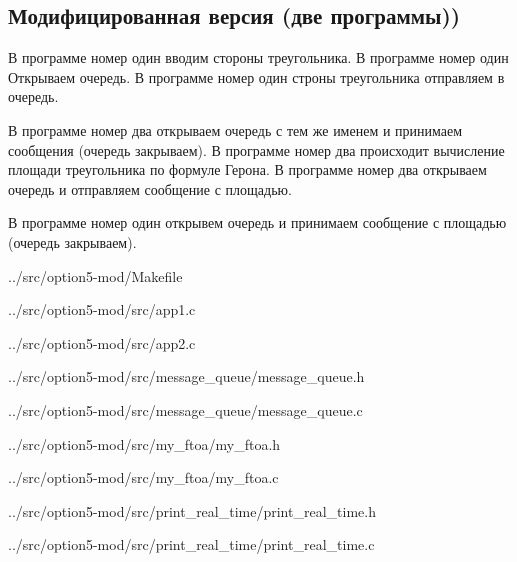 \subsection*{Модифицированная версия (две программы))}

В программе номер один вводим стороны треугольника. В программе номер один Открываем очередь. В программе номер один строны треугольника отправляем в очередь.

В программе номер два открываем очередь с тем же именем и принимаем сообщения (очередь закрываем). В программе номер два происходит вычисление площади треугольника по формуле Герона. В программе номер два открываем очередь и отправляем сообщение с площадью.

В программе номер один открывем очередь и принимаем сообщение с площадью (очередь закрываем).

\newpage


{../src/option5-mod/Makefile}


{../src/option5-mod/src/app1.c}


{../src/option5-mod/src/app2.c}


{../src/option5-mod/src/message_queue/message_queue.h}


{../src/option5-mod/src/message_queue/message_queue.c}


{../src/option5-mod/src/my_ftoa/my_ftoa.h}


{../src/option5-mod/src/my_ftoa/my_ftoa.c}


{../src/option5-mod/src/print_real_time/print_real_time.h}


{../src/option5-mod/src/print_real_time/print_real_time.c}

%

